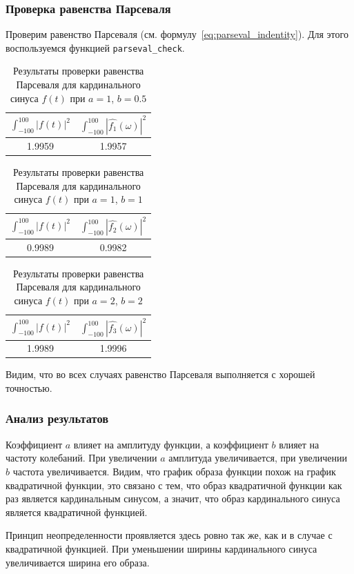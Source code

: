 \FloatBarrier
\subsubsection{Проверка равенства Парсеваля}
Проверим равенство Парсеваля (см. формулу~\eqref{eq:parseval_indentity}). Для этого воспользуемся функцией \texttt{parseval\_check}. 
\begin{table}[ht!]
    \centering
    \begin{tabular}{|c|c|}
        \hline
        $\displaystyle\int_{-100}^{100}{|f(t)|^2}$ & $\displaystyle\int_{-100}^{100}{|\hat{f_1}(\omega)|^2}$ \\
        \hline
        1.9959 & 1.9957 \\
        \hline
    \end{tabular}
    \caption{Результаты проверки равенства Парсеваля для кардинального синуса $f(t)$ при $a = 1$, $b = 0.5$}
    \label{tab:sinc_1_parseval_check}
\end{table}

\begin{table}[ht!]
    \centering
    \begin{tabular}{|c|c|}
        \hline
        $\displaystyle\int_{-100}^{100}{|f(t)|^2}$ & $\displaystyle\int_{-100}^{100}{|\hat{f_2}(\omega)|^2}$ \\
        \hline
        0.9989 & 0.9982 \\
        \hline
    \end{tabular}
    \caption{Результаты проверки равенства Парсеваля для кардинального синуса $f(t)$ при $a = 1$, $b = 1$}
    \label{tab:sinc_2_parseval_check}
\end{table}

\begin{table}[ht!]
    \centering
    \begin{tabular}{|c|c|}
        \hline
        $\displaystyle\int_{-100}^{100}{|f(t)|^2}$ & $\displaystyle\int_{-100}^{100}{|\hat{f_3}(\omega)|^2}$ \\
        \hline
        1.9989 & 1.9996 \\
        \hline
    \end{tabular}
    \caption{Результаты проверки равенства Парсеваля для кардинального синуса $f(t)$ при $a = 2$, $b = 2$}
    \label{tab:sinc_3_parseval_check}
\end{table}

Видим, что во всех случаях равенство Парсеваля выполняется с хорошей точностью. 

\subsubsection{Анализ результатов}
Коэффициент $a$ влияет на амплитуду функции, а коэффициент $b$ влияет на частоту колебаний. При увеличении $a$ амплитуда увеличивается, при увеличении $b$ частота увеличивается.
Видим, что график образа функции похож на график квадратичной функции, это связано с тем, что образ квадратичной функции как раз является кардинальным синусом, а значит, что образ кардинального синуса является квадратичной функцией.

Принцип неопределенности проявляется здесь ровно так же, как и в случае с квадратичной функцией. При уменьшении ширины кардинального синуса увеличивается ширина его образа. 